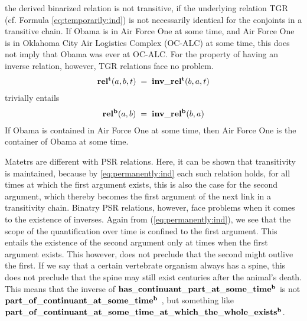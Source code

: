 %
the derived binarized relation is not transitive, if the underlying relation TGR (cf. Formula \ref{eq:temporarily:ind}) is 
not necessarily identical for the conjoints in a transitive chain. If Obama is in Air Force One at some time, 
and Air Force One is in Oklahoma City Air Logistics Complex (OC-ALC) at some time, this does not imply that Obama 
was ever at OC-ALC. For the property of having an inverse relation, however, TGR relations face no problem.  
% 
\begin{equation}
\begin{split}
\mathrm{\mathbf{rel^t}}(a,b,t) \; = \; \mathrm{\mathbf{inv\_rel^t}}(b,a,t)  
\end{split}
\label{eq:trinv}
\end{equation}    
%
trivially entails
%
\begin{equation}
\begin{split}
\mathrm{\mathbf{rel^b}}(a,b) \; = \; \mathrm{\mathbf{inv\_rel^b}}(b,a)  
\end{split}
\label{eq:trinv2}
\end{equation}    
%
If Obama is contained in Air Force One at some time, then Air Force One is the container of Obama at some time.

Matetrs are different with PSR relations. Here, it can be shown that transitivity is maintained, because by \ref{eq:permanently:ind} each such relation holds, 
for all times at which the first argument exists, this is also the case for the second argument, which thereby becomes the first argument of the next link in a transitivity chain.
Binatry PSR relations, however, face problems when it comes to the existence of inverses. 
Again from (\ref{eq:permanently:ind}), we see that the scope of the quantification over time is confined to the first argument. This entails the existence of the second argument only at times when the first argument exists. This however, does not preclude that the second might outlive the first. If we say that a certain vertebrate organism always has a spine, this does not preclude that the spine may still exist centuries after the animal's death.    
This means that the inverse of $\mathrm{\mathbf{has\_continuant\_part\_at\_some\_time^b}}$ is not $\mathrm{\mathbf{part\_of\_continuant\_at\_some\_time^b}}$ \todo{}, but something like $\mathrm{\mathbf{part\_of\_continuant\_at\_some\_time\_at\_which\_the\_whole\_exists^b}}$.  

